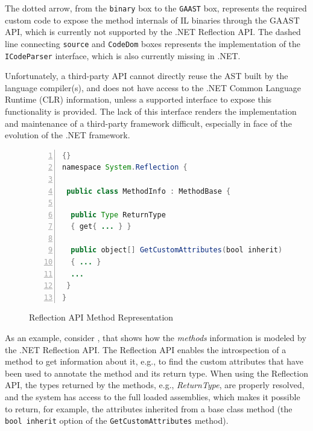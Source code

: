 The dotted arrow, from the {\tt binary} box to the {\tt GAAST} box, represents the required custom code to expose the method internals of IL binaries through the GAAST API, which is currently not supported by the .NET Re\-fle\-ction API. The dashed line connecting {\tt source} and {\tt Code\-Dom} boxes represents the implementation of the {\tt ICo\-de\-Par\-ser} interface, which is also currently missing in .NET.

Unfortunately, a third-party API cannot directly reuse the AST built by the language compiler(s), and does not have access to the .NET Common Language Runtime (CLR) information, unless a supported interface to expose this functionality is provided. The lack of this interface renders the implementation and maintenance of a third-party framework difficult, especially in face of the evolution of the .NET framework.

\begin{figure}[ht]
	\centering
	\begin{minipage}[b]{8.5cm}
	\begin{center}	
\begin{scriptsize}
		\begin{lstlisting}[numbers=left,language=Java,frame=leftline]{}
namespace System.Reflection {

 public class MethodInfo : MethodBase {
	
  public Type ReturnType
  { get{ ... } }
		
  public object[] GetCustomAttributes(bool inherit)
  { ... }
  ...
 }
}
		\end{lstlisting}
		\end{scriptsize}
	\end{center}
	\caption{Reflection API Method Representation}
	\label{c3:netref}
\end{minipage}	
\end{figure}

As an example, consider , that shows how the \textit{methods} information is modeled by the .NET Reflection API. The Reflection API enables the introspection of a method to get information about it, e.g., to find the custom attributes that have been used to annotate the method and its return type. When using the Reflection API, the types returned by the methods, e.g., \textit{Re\-turn\-Ty\-pe}, are properly resolved, and the system has access to the full loaded assemblies, which makes it possible to return, for example, the attributes inherited from a base class method (the \texttt{bool inherit} option of the \texttt{Get\-Cu\-stom\-Attri\-bu\-tes} method).

